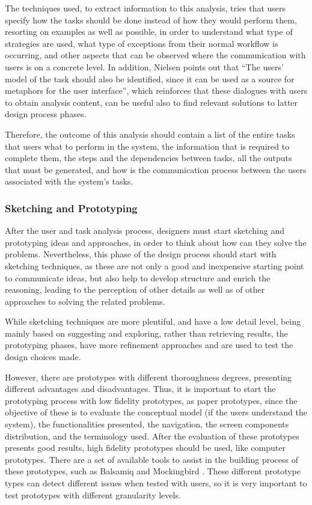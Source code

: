 The techniques used, to extract information to this analysis, tries that users specify how the tasks should be done instead of how they would perform them, resorting on examples as well as possible, in order to understand what type of strategies are used, what type of exceptions from their normal workflow is occurring, and other aspects that can be observed where the communication with users is on a concrete level. \cite{usabilityEngineering} In addition, Nielsen \cite{usabilityEngineering} points out that  “The users' model of the task should also be identified, since it can be used as a source for metaphors for the user interface”, which reinforces that these dialogues with users to obtain analysis content, can be useful also to find relevant solutions to latter design process phases.

Therefore, the outcome of this analysis should contain a list of the entire tasks that users what to perform in the system, the information that is required to complete them, the steps and the dependencies between tasks, all the outputs that must be generated, and how is the communication process between the users associated with the system’s tasks. \cite{usabilityEngineering}


\subsubsection{Sketching and Prototyping}
\label{subsubsec:sketching_and_prototyping}
After the user and task analysis process, designers must start sketching and prototyping ideas and approaches, in order to think about how can they solve the problems. Nevertheless, this phase of the design process should start with sketching techniques, as these are not only a good and inexpensive starting point to communicate ideas, but also help to develop structure and enrich the reasoning, leading to the perception of other details as well as of other approaches to solving the related problems.

While sketching techniques are more plentiful, and have a low detail level, being mainly based on suggesting and exploring, rather than retrieving results, the prototyping phases, have more refinement approaches and are used to test the design choices made.

However, there are prototypes with different thoroughness degrees, presenting different advantages and disadvantages. Thus, it is important to start the prototyping process with low fidelity prototypes, as paper prototypes, since the objective of these is to evaluate the conceptual model (if the users understand the system), the functionalities presented, the navigation, the screen components distribution, and the terminology used. After the evaluation of these prototypes presents good results, high fidelity prototypes should be used, like computer prototypes. There are a set of available tools to assist in the building process of these prototypes, such as Balsamiq \cite{balsamiq} and Mockingbird \cite{mockingbird}. These different prototype types can detect different issues when tested with users, so it is very important to test prototypes with different granularity levels.

